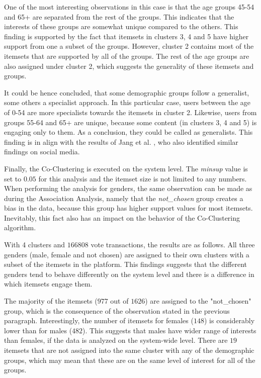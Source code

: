 One of the most interesting observations in this case is that the age groups 45-54 and 65+ are separated from the rest of the groups. This indicates that the interests of these groups are somewhat unique compared to the others. This finding is supported by the fact that itemsets in clusters 3, 4 and 5 have higher support from one a subset of the groups. However, cluster 2 contains most of the itemsets that are supported by all of the groups. The rest of the age groups are also assigned under cluster 2, which suggests the generality of these itemsets and groups. 

It could be hence concluded, that some demographic groups follow a generalist, some others a specialist approach. In this particular case, users between the age of 0-54 are more specialists towards the itemsets in cluster 2. Likewise, users from groups 55-64 and 65+ are unique, because some content (in clusters 3, 4 and 5) is engaging only to them. As a conclusion, they could be called as generalists. This finding is in align with the results of Jang et al. \cite{jang2015no}, who also identified similar findings on social media. 

Finally, the Co-Clustering is executed on the system level. The \emph{minsup} value is set to $0.05$ for this analysis and the itemset size is not limited to any numbers. When performing the analysis for genders, the same observation can be made as during the Association Analysis, namely that the \emph{not\_chosen} group creates a bias in the data, because this group has higher support values for most itemsets. Inevitably, this fact also has an impact on the behavior of the Co-Clustering algorithm. 

With 4 clusters and $166 808$ vote transactions, the results are as follows. All three genders (male, female and not chosen) are assigned to their own clusters with a subset of the itemsets in the platform. This findings suggests that the different genders tend to behave differently on the system level and there is a difference in which itemsets engage them. 

The majority of the itemsets ($977$ out of $1 626$) are assigned to the "not\_chosen" group, which is the consequence of the observation stated in the previous paragraph. Interestingly, the number of itemsets for females ($148$) is considerably lower than for males ($482$). This suggests that males have wider range of interests than females, if the data is analyzed on the system-wide level. There are $19$ itemsets that are not assigned into the same cluster with any of the demographic groups, which may mean that these are on the same level of interest for all of the groups. 

